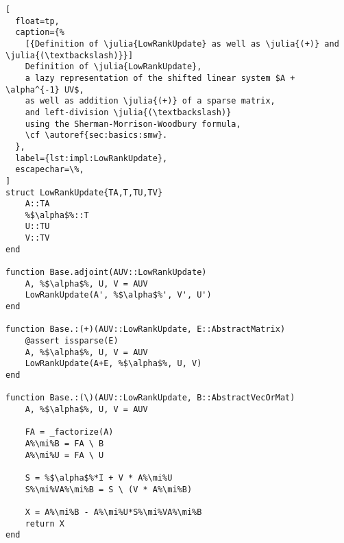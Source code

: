 \def\mi{\textsuperscript{-1}}
\begin{lstlisting}[
  float=tp,
  caption={%
    [{Definition of \julia{LowRankUpdate} as well as \julia{(+)} and \julia{(\textbackslash)}}]
    Definition of \julia{LowRankUpdate},
    a lazy representation of the shifted linear system $A + \alpha^{-1} UV$,
    as well as addition \julia{(+)} of a sparse matrix,
    and left-division \julia{(\textbackslash)}
    using the Sherman-Morrison-Woodbury formula,
    \cf \autoref{sec:basics:smw}.
  },
  label={lst:impl:LowRankUpdate},
  escapechar=\%,
]
struct LowRankUpdate{TA,T,TU,TV}
    A::TA
    %$\alpha$%::T
    U::TU
    V::TV
end

function Base.adjoint(AUV::LowRankUpdate)
    A, %$\alpha$%, U, V = AUV
    LowRankUpdate(A', %$\alpha$%', V', U')
end

function Base.:(+)(AUV::LowRankUpdate, E::AbstractMatrix)
    @assert issparse(E)
    A, %$\alpha$%, U, V = AUV
    LowRankUpdate(A+E, %$\alpha$%, U, V)
end

function Base.:(\)(AUV::LowRankUpdate, B::AbstractVecOrMat)
    A, %$\alpha$%, U, V = AUV

    FA = _factorize(A)
    A%\mi%B = FA \ B
    A%\mi%U = FA \ U

    S = %$\alpha$%*I + V * A%\mi%U
    S%\mi%VA%\mi%B = S \ (V * A%\mi%B)

    X = A%\mi%B - A%\mi%U*S%\mi%VA%\mi%B
    return X
end
\end{lstlisting}

